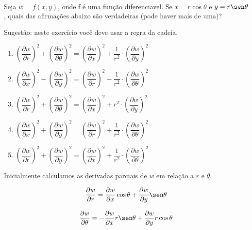 \\ \\ \\
\item Seja $w = f(x, y)$, onde f é uma função diferenciavel.
Se $x = r \cos \theta$ e $y = r \sen \theta$, quais das
afirmações abaixo são verdadeiras (pode haver mais de uma)?

Sugestão: neste exercício você deve usar a regra da cadeia.

\begin{enumerate}
	\item $\left(\dfrac{\partial w}{\partial r}\right)^2 +
			\left(\dfrac{\partial w}{\partial \theta}\right)^2
			= \left(\dfrac{\partial w}{\partial x}\right)^2 + \dfrac{1}{r^2} \cdot
			\left(\dfrac{\partial w}{\partial y}\right)^2$
	
	\item $\left(\dfrac{\partial w}{\partial x}\right)^2 -
			\left(\dfrac{\partial w}{\partial y}\right)^2
			= \left(\dfrac{\partial w}{\partial r}\right)^2 - \dfrac{1}{r^2} \cdot
			\left(\dfrac{\partial w}{\partial \theta}\right)^2$
			
	\item $\left(\dfrac{\partial w}{\partial r}\right)^2 +
			\left(\dfrac{\partial w}{\partial \theta}\right)^2
			= \left(\dfrac{\partial w}{\partial x}\right)^2 + r^2 \cdot
			\left(\dfrac{\partial w}{\partial y}\right)^2$
			
	\item $\left(\dfrac{\partial w}{\partial x}\right)^2 +
			\left(\dfrac{\partial w}{\partial y}\right)^2
			= \left(\dfrac{\partial w}{\partial r}\right)^2 + \dfrac{1}{r^2} \cdot
			\left(\dfrac{\partial w}{\partial \theta}\right)^2$
	
	\item $\left(\dfrac{\partial w}{\partial r}\right)^2 +
			\left(\dfrac{\partial w}{\partial y}\right)^2
			= \left(\dfrac{\partial w}{\partial x}\right)^2 + \dfrac{1}{r^2} \cdot
			\left(\dfrac{\partial w}{\partial \theta}\right)^2$
\end{enumerate}

\solucao

Inicialmente calculamos as derivadas parciais de
$w$ em relação a $r$ e $\theta$.

\begin{center}
$$
\begin{array}{c}
	\dfrac{\partial w}{\partial r} =
	\dfrac{\partial w}{\partial x} \cos \theta +
	\dfrac{\partial w}{\partial y} \sen \theta \\ \\
	\dfrac{\partial w}{\partial \theta} =
	-\dfrac{\partial w}{\partial x} r \sen \theta +
	\dfrac{\partial w}{\partial y} r \cos \theta
\end{array}
$$
\end{center}

